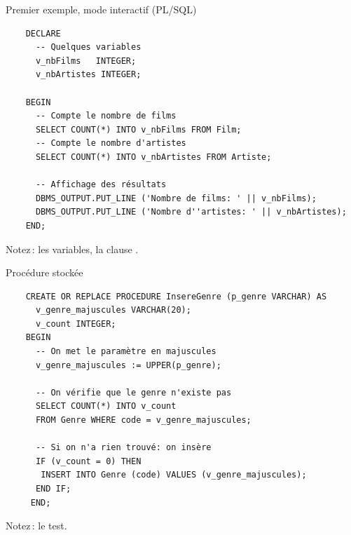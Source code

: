 \begin{frame}[fragile]{Premier exemple, mode interactif (PL/SQL)}

\begin{footnotesize}
\begin{verbatim}
    DECLARE
      -- Quelques variables
      v_nbFilms   INTEGER;
      v_nbArtistes INTEGER;

    BEGIN
      -- Compte le nombre de films
      SELECT COUNT(*) INTO v_nbFilms FROM Film;
      -- Compte le nombre d'artistes
      SELECT COUNT(*) INTO v_nbArtistes FROM Artiste;

      -- Affichage des résultats
      DBMS_OUTPUT.PUT_LINE ('Nombre de films: ' || v_nbFilms);
      DBMS_OUTPUT.PUT_LINE ('Nombre d''artistes: ' || v_nbArtistes);
    END;
\end{verbatim}
\end{footnotesize}

\vfill 

\alert{Notez}\,: les variables, la clause .

\end{frame}

\begin{frame}[fragile]{Procédure stockée}

\begin{footnotesize}
\begin{verbatim}
    CREATE OR REPLACE PROCEDURE InsereGenre (p_genre VARCHAR) AS 
      v_genre_majuscules VARCHAR(20);
      v_count INTEGER;
    BEGIN
      -- On met le paramètre en majuscules
      v_genre_majuscules := UPPER(p_genre);

      -- On vérifie que le genre n'existe pas 
      SELECT COUNT(*) INTO v_count 
      FROM Genre WHERE code = v_genre_majuscules;
      
      -- Si on n'a rien trouvé: on insère
      IF (v_count = 0) THEN
       INSERT INTO Genre (code) VALUES (v_genre_majuscules);
      END IF;
     END;
\end{verbatim}
\end{footnotesize}

\vfill 

\alert{Notez}\,: le test.

\end{frame}


